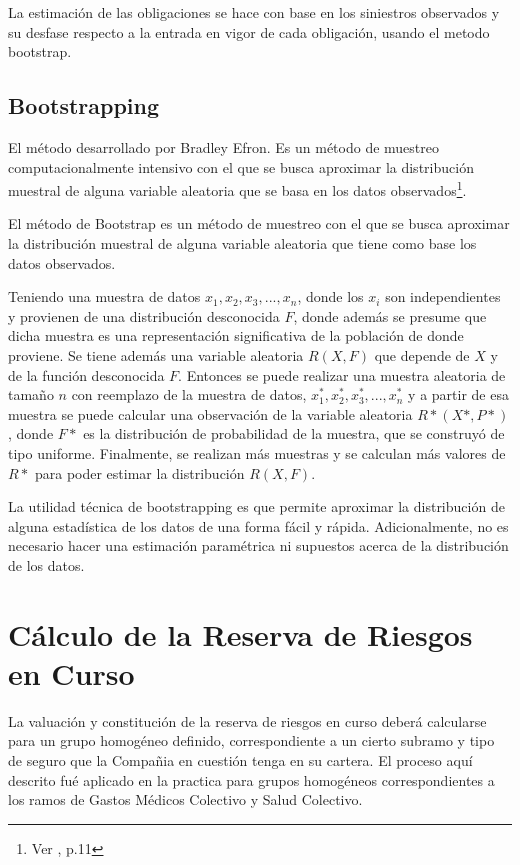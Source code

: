 \documentclass[11pt,twoside,openright,spanish]{report}
\numberwithin{equation}{chapter}
\numberwithin{figure}{chapter}
\numberwithin{table}{chapter}
\begin{document}
	La estimación de las obligaciones se hace con base en los siniestros observados y su desfase respecto a la entrada en vigor de cada obligación, usando el metodo bootstrap.
	
	\section{Bootstrapping}
	El método desarrollado por Bradley Efron. Es un método de muestreo computacionalmente intensivo con el que se busca aproximar la distribución muestral de alguna variable aleatoria que se basa en los datos observados\footnote{Ver \citet{MBootstrap}, p.11}.

	El método de Bootstrap es un método de muestreo con el que se busca aproximar la distribución muestral de alguna variable aleatoria que tiene como base los datos observados.

	Teniendo una muestra de datos $x_{1},x_{2},x_{3},...,x_{n}$, donde los $x_{i}$ son independientes y provienen de una distribución desconocida $F$, donde además se presume que dicha muestra es una representación significativa de la población de donde proviene. Se tiene además una variable aleatoria $R(X,F)$ que depende de $X$ y de la función desconocida $F$. Entonces se puede realizar una muestra aleatoria de tamaño $n$ con reemplazo de la muestra de datos, $x_{1}^{*},x_{2}^{*},x_{3}^{*},...,x_{n}^{*}$ y a partir de esa muestra se puede calcular una observación de la variable aleatoria $R*(X*,P*)$, donde $F*$ es la distribución de probabilidad de la muestra, que se construyó de tipo uniforme. Finalmente, se realizan más muestras y se calculan más valores de $R*$ para poder estimar la distribución $R(X,F)$.

	La utilidad técnica de bootstrapping es que permite aproximar la distribución de alguna estadística de los datos de una forma fácil y rápida. Adicionalmente, no es necesario hacer una estimación paramétrica ni supuestos acerca de la distribución de los datos.

	\chapter{Cálculo de la Reserva de Riesgos en Curso}\label{metnum}
	
	La valuación y constitución de la reserva de riesgos en curso deberá calcularse para un grupo homogéneo definido, correspondiente a un cierto subramo y tipo de seguro que la Compañia en cuestión tenga en su cartera. El proceso aquí descrito fué aplicado en la practica para grupos homogéneos correspondientes a los ramos de Gastos Médicos Colectivo y Salud Colectivo.
	
\end{document}
